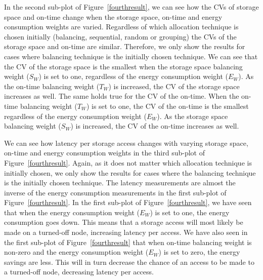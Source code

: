 \documentclass[preprint,12pt]{elsarticle}
\begin{document}
In the second sub-plot of Figure~\ref{fourthresult}, we can see how the CVs of storage space and
on-time change when the storage space, on-time and energy consumption weights are varied. Regardless of
which allocation technique is chosen initially (balancing, sequential, random or grouping) the CVs of the
storage space and on-time are similar. Therefore, we only show the results for cases where balancing technique
is the initially chosen technique. We can see that the CV of the storage space is the smallest when the storage space
balancing weight ($S_W$) is set to one, regardless of the energy consumption weight ($E_W$). As the on-time
balancing weight ($T_W$) is increased, the CV of the storage space increases as well. The same holds true
for the CV of the on-time. When the on-time balancing weight ($T_W$) is set to one, the CV of the on-time
is the smallest regardless of the energy consumption weight ($E_W$). As the storage space balancing
weight ($S_W$) is increased, the CV of the on-time increases as well.

We can see how latency per storage access changes with varying storage space, on-time and energy consumption
weights in the third sub-plot of Figure~\ref{fourthresult}. Again, as it does not matter which allocation technique
is initially chosen, we only show the results for cases where the balancing technique is the initially chosen
technique. The latency
measurements are almost the inverse of the energy consumption measurements in the first sub-plot of
Figure~\ref{fourthresult}. In the first sub-plot of Figure~\ref{fourthresult}, we have seen that when the energy
consumption weight ($E_W$) is set to one, the energy consumption goes down. This means that a storage access
will most likely be made on a turned-off node, increasing latency per access. We have also seen in the
first sub-plot of Figure~\ref{fourthresult} that when on-time balancing weight is non-zero and the energy
consumption weight ($E_W$) is set to zero, the energy savings are less. This will in turn
decrease the chance of an access to be made to a turned-off node, decreasing latency per access.
\end{document}
